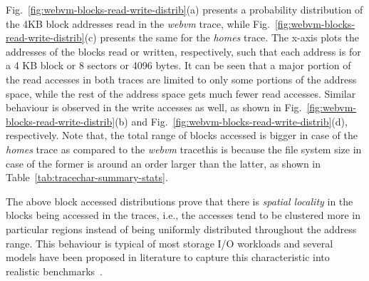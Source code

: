 Fig.~\ref{fig:webvm-blocks-read-write-distrib}(a) presents a probability distribution 
of the 4KB block addresses read in the \textit{webvm} trace, 
while Fig.~\ref{fig:webvm-blocks-read-write-distrib}(c) presents the same
for the \textit{homes} trace. The x-axis plots the addresses of the blocks 
read or written, respectively, such that each address is for a 4 KB block 
or 8 sectors or 4096 bytes. 
It can be seen that a major portion of
the read accesses in both traces are limited to only some portions of the address space, 
while the rest of the address space gets much fewer read accesses. 
Similar behaviour is observed in the write accesses as well, as shown
in Fig.~\ref{fig:webvm-blocks-read-write-distrib}(b)
and Fig.~\ref{fig:webvm-blocks-read-write-distrib}(d), respectively. 
Note that, the total range of blocks accessed is bigger in case of
the \textit{homes} trace as compared to the \textit{webvm} trace\textemdash{}this is
because the file system size in case of the former is around an order
larger than the latter, as shown in 
Table~\ref{tab:tracechar-summary-stats}.

The above block accessed distributions prove that there is \textit{spatial locality} in
the blocks being accessed in the traces, i.e., the accesses tend to be clustered more
in particular regions instead of being uniformly distributed throughout the address
range. This behaviour is typical of most storage I/O workloads and several
models have been proposed in literature to capture this characteristic
into realistic benchmarks~\cite{jump-based-synthetic, storagecharacterization, storagemodeling,
storagereplay}.


